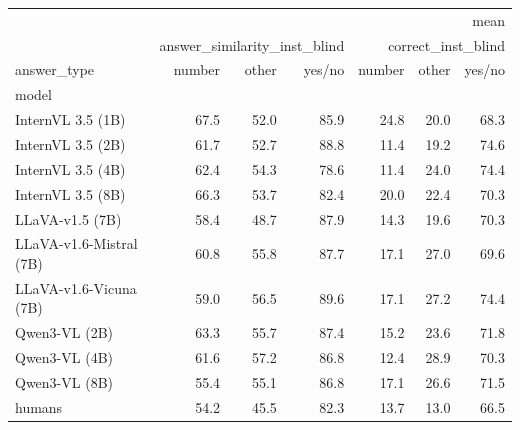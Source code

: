 \begin{tabular}{lrrrrrr}
\toprule
 & \multicolumn{6}{r}{mean} \\
 & \multicolumn{3}{r}{answer_similarity_inst_blind} & \multicolumn{3}{r}{correct_inst_blind} \\
answer_type & number & other & yes/no & number & other & yes/no \\
model &  &  &  &  &  &  \\
\midrule
InternVL 3.5 (1B) & 67.5 & 52.0 & 85.9 & 24.8 & 20.0 & 68.3 \\
InternVL 3.5 (2B) & 61.7 & 52.7 & 88.8 & 11.4 & 19.2 & 74.6 \\
InternVL 3.5 (4B) & 62.4 & 54.3 & 78.6 & 11.4 & 24.0 & 74.4 \\
InternVL 3.5 (8B) & 66.3 & 53.7 & 82.4 & 20.0 & 22.4 & 70.3 \\
LLaVA-v1.5 (7B) & 58.4 & 48.7 & 87.9 & 14.3 & 19.6 & 70.3 \\
LLaVA-v1.6-Mistral (7B) & 60.8 & 55.8 & 87.7 & 17.1 & 27.0 & 69.6 \\
LLaVA-v1.6-Vicuna (7B) & 59.0 & 56.5 & 89.6 & 17.1 & 27.2 & 74.4 \\
Qwen3-VL (2B) & 63.3 & 55.7 & 87.4 & 15.2 & 23.6 & 71.8 \\
Qwen3-VL (4B) & 61.6 & 57.2 & 86.8 & 12.4 & 28.9 & 70.3 \\
Qwen3-VL (8B) & 55.4 & 55.1 & 86.8 & 17.1 & 26.6 & 71.5 \\
humans & 54.2 & 45.5 & 82.3 & 13.7 & 13.0 & 66.5 \\
\bottomrule
\end{tabular}
